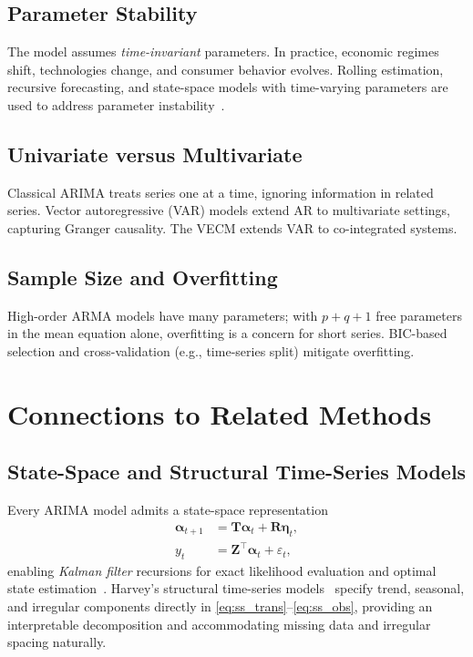 \documentclass[conference]{IEEEtran}
\theoremstyle{definition}
\begin{document}
\subsection{Parameter Stability}

The model assumes \emph{time-invariant} parameters. In practice, economic
regimes shift, technologies change, and consumer behavior evolves. Rolling
estimation, recursive forecasting, and state-space models with time-varying
parameters are used to address parameter instability~\cite{durbin2012time}.

\subsection{Univariate versus Multivariate}

Classical ARIMA treats series one at a time, ignoring information in related
series. Vector autoregressive (VAR) models extend AR to multivariate settings,
capturing Granger causality. The VECM extends VAR to co-integrated systems.

\subsection{Sample Size and Overfitting}

High-order ARMA models have many parameters; with $p + q + 1$ free parameters
in the mean equation alone, overfitting is a concern for short series.
BIC-based selection and cross-validation (e.g., time-series split) mitigate
overfitting.

\section{Connections to Related Methods}
\label{sec:related}

\subsection{State-Space and Structural Time-Series Models}

Every ARIMA model admits a state-space representation
\begin{align}
  \boldsymbol{\alpha}_{t+1} &= \mathbf{T}\boldsymbol{\alpha}_t
                              + \mathbf{R}\boldsymbol{\eta}_t, \label{eq:ss_trans}\\
  y_t &= \mathbf{Z}^{\top}\boldsymbol{\alpha}_t + \varepsilon_t, \label{eq:ss_obs}
\end{align}
enabling \emph{Kalman filter} recursions for exact likelihood evaluation
and optimal state estimation~\cite{kalman1960new,durbin2012time}.
Harvey's structural time-series
models~\cite{harvey1990forecasting} specify trend, seasonal, and
irregular components directly in \eqref{eq:ss_trans}--\eqref{eq:ss_obs},
providing an interpretable decomposition and accommodating missing data
and irregular spacing naturally.
\end{document}
